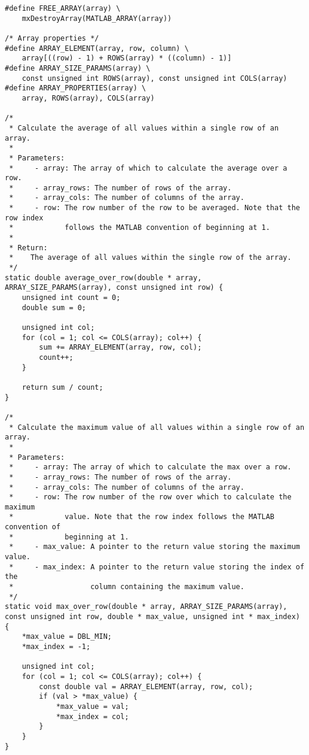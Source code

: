 \begin{lstlisting}
#define FREE_ARRAY(array) \
	mxDestroyArray(MATLAB_ARRAY(array))

/* Array properties */
#define ARRAY_ELEMENT(array, row, column) \
	array[((row) - 1) + ROWS(array) * ((column) - 1)]
#define ARRAY_SIZE_PARAMS(array) \
	const unsigned int ROWS(array), const unsigned int COLS(array)
#define ARRAY_PROPERTIES(array) \
	array, ROWS(array), COLS(array)

/*
 * Calculate the average of all values within a single row of an array.
 *
 * Parameters:
 *     - array: The array of which to calculate the average over a row.
 *     - array_rows: The number of rows of the array.
 *     - array_cols: The number of columns of the array.
 *     - row: The row number of the row to be averaged. Note that the row index 
 *            follows the MATLAB convention of beginning at 1.
 *
 * Return:
 *    The average of all values within the single row of the array.
 */
static double average_over_row(double * array, ARRAY_SIZE_PARAMS(array), const unsigned int row) {
    unsigned int count = 0;
    double sum = 0;
    
    unsigned int col;
    for (col = 1; col <= COLS(array); col++) {
        sum += ARRAY_ELEMENT(array, row, col);
        count++;
    }

    return sum / count;
}

/*
 * Calculate the maximum value of all values within a single row of an array.
 *
 * Parameters:
 *     - array: The array of which to calculate the max over a row.
 *     - array_rows: The number of rows of the array.
 *     - array_cols: The number of columns of the array.
 *     - row: The row number of the row over which to calculate the maximum 
 *            value. Note that the row index follows the MATLAB convention of 
 *            beginning at 1.
 *     - max_value: A pointer to the return value storing the maximum value.
 *     - max_index: A pointer to the return value storing the index of the  
 *                  column containing the maximum value.
 */
static void max_over_row(double * array, ARRAY_SIZE_PARAMS(array), const unsigned int row, double * max_value, unsigned int * max_index) {
	*max_value = DBL_MIN;
	*max_index = -1;

	unsigned int col;
    for (col = 1; col <= COLS(array); col++) {
        const double val = ARRAY_ELEMENT(array, row, col);
        if (val > *max_value) {
            *max_value = val;
            *max_index = col;
        }
    }
}


\end{lstlisting}
